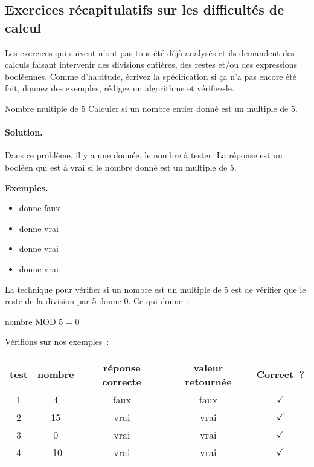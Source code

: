 		\subsection{Exercices récapitulatifs sur les difficultés de calcul}
		\label{prem-ex-cplx}
		
			Les exercices qui suivent n’ont pas tous été déjà analysés
			et ils demandent des calculs faisant intervenir
			des divisions entières, des restes et/ou des expressions booléennes.
			Comme d’habitude, écrivez la spécification
			si ça n’a pas encore été fait,
			donnez des exemples, rédigez un algorithme
			et vérifiez-le.
		
			\begin{Exercice}{Nombre multiple de 5}
				\label{algo:mult5}
				Calculer si un nombre entier donné est un multiple de 5.
				\paragraph{Solution.}
				Dans ce problème,
				il y a une donnée, le nombre à tester.
				La réponse est un booléen
				qui est à vrai si le nombre donné est un multiple de 5.
				\begin{center}
				\end{center}
				\textbf{Exemples.}
				\begin{multicols}{4}
					\begin{itemize}
					\item {} donne faux
					\item {} donne vrai
					\item {} donne vrai
					\item {} donne vrai
					\end{itemize}
				\end{multicols}
				La technique pour vérifier si un nombre est
				un multiple de 5 est de vérifier que le reste
				de la division par 5 donne 0.
				Ce qui donne~:
				\begin{pseudocode}[1]
						\Return nombre MOD 5 = 0
					\EndAlgo
				\end{pseudocode}
				Vérifions sur nos exemples~:
				\begin{center}
				\begin{tabular}{|c|c|c|c|c|}
				\hline
				test \no & nombre & réponse correcte & valeur retournée & Correct~? \\\hline
				\hline 
				1 & 4   & faux & faux & {\color{ForestGreen}$\checkmark$} \\\hline
				2 & 15  & vrai & vrai & {\color{ForestGreen}$\checkmark$} \\\hline
				3 & 0   & vrai & vrai & {\color{ForestGreen}$\checkmark$} \\\hline
				4 & -10 & vrai & vrai & {\color{ForestGreen}$\checkmark$} \\\hline
				\end{tabular}
				\end{center}
			\end{Exercice}

